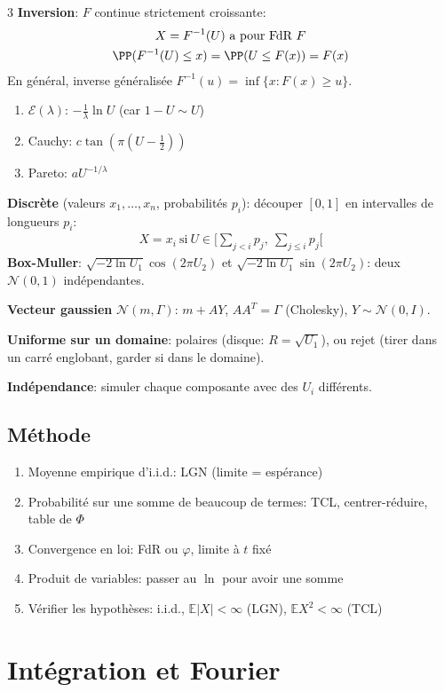 \documentclass[12pt, a4paper]{article}
\newcommand{\E}{\mathbb{E}}
\begin{document}
\begin{multicols*}{3}
	\textbf{Inversion}: $F$ continue strictement croissante:
	\begin{gather*}
		X=F^{-1}(U)\ \text{a pour FdR}\ F\\ \PP(F^{-1}(U)\leq x)=\PP(U\leq F(x))=F(x)
	\end{gather*}
	En général, inverse généralisée $F^{-1}(u)=\inf\{x:F(x)\geq u\}$.
	\begin{enumerate}[\roman*.]
		\item $\mathcal E(\lambda)$: $-\frac1\lambda\ln U$ (car $1-U\sim U$)
		\item Cauchy: $c\tan(\pi(U-\frac12))$
		\item Pareto: $aU^{-1/\lambda}$
	\end{enumerate}
	\textbf{Discrète} (valeurs $x_1,\dots,x_n$, probabilités $p_i$): découper $[0,1]$ en intervalles de longueurs $p_i$:
	\begin{gather*}
		X=x_i\ \text{si}\ U\in\Big[\sum_{j<i}p_j,\ \sum_{j\leq i}p_j\Big[
	\end{gather*}
	\textbf{Box-Muller}: $\sqrt{-2\ln U_1}\cos(2\pi U_2)$ et $\sqrt{-2\ln U_1}\sin(2\pi U_2)$: deux $\mathcal N(0,1)$ indépendantes.

	\textbf{Vecteur gaussien} $\mathcal N(m,\Gamma)$: $m+AY$, $AA^T=\Gamma$ (Cholesky), $Y\sim\mathcal N(0,I)$.

	\textbf{Uniforme sur un domaine}: polaires (disque: $R=\sqrt{U_1}$), ou rejet (tirer dans un carré englobant, garder si dans le domaine).

	\textbf{Indépendance}: simuler chaque composante avec des $U_i$ différents.

	\subsection{Méthode}
	\begin{enumerate}[\roman*.]
		\item Moyenne empirique d'i.i.d.: LGN (limite = espérance)
		\item Probabilité sur une somme de beaucoup de termes: TCL, centrer-réduire, table de $\Phi$
		\item Convergence en loi: FdR ou $\varphi$, limite à $t$ fixé
		\item Produit de variables: passer au $\ln$ pour avoir une somme
		\item Vérifier les hypothèses: i.i.d., $\E|X|<\infty$ (LGN), $\E X^2<\infty$ (TCL)
	\end{enumerate}

	\colbreak
	\section{Intégration et Fourier}

\end{multicols*}
\end{document}
